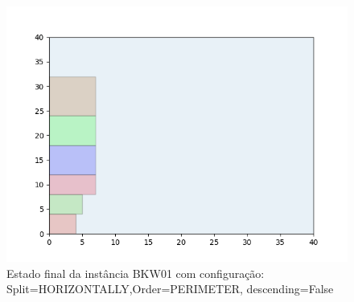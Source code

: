 \begin{figure}[H]
    \centering
    \caption[]{Estado final da instância BKW01 com configuração: Split=HORIZONTALLY,Order=PERIMETER, descending=False}
    \label{fig:bkw01-horizontally-perimeter-false}
    \includegraphics[scale=0.5]{output/figures/bkw/bkw01/horizontally/perimeter/false/00}
\end{figure}